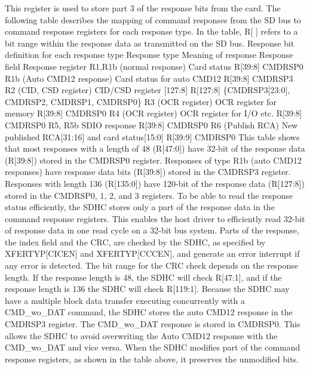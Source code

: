 This register is used to store part 3 of the response bits from the card. The following table describes the mapping of command responses from the SD bus to command response registers for each response type. In the table, R\mbox{[} \mbox{]} refers to a bit range within the response data as transmitted on the SD bus. Response bit definition for each response type Response type Meaning of response Response field Response register R1,R1b (normal response) Card status R\mbox{[}39\+:8\mbox{]} C\+M\+D\+R\+S\+P0 R1b (Auto C\+M\+D12 response) Card status for auto C\+M\+D12 R\mbox{[}39\+:8\mbox{]} C\+M\+D\+R\+S\+P3 R2 (C\+ID, C\+SD register) C\+I\+D/\+C\+SD register \mbox{[}127\+:8\mbox{]} R\mbox{[}127\+:8\mbox{]} \{C\+M\+D\+R\+S\+P3\mbox{[}23\+:0\mbox{]}, C\+M\+D\+R\+S\+P2, C\+M\+D\+R\+S\+P1, C\+M\+D\+R\+S\+P0\} R3 (O\+CR register) O\+CR register for memory R\mbox{[}39\+:8\mbox{]} C\+M\+D\+R\+S\+P0 R4 (O\+CR register) O\+CR register for I/O etc. R\mbox{[}39\+:8\mbox{]} C\+M\+D\+R\+S\+P0 R5, R5b S\+D\+IO response R\mbox{[}39\+:8\mbox{]} C\+M\+D\+R\+S\+P0 R6 (Publish R\+CA) New published R\+CA\mbox{[}31\+:16\mbox{]} and card status\mbox{[}15\+:0\mbox{]} R\mbox{[}39\+:9\mbox{]} C\+M\+D\+R\+S\+P0 This table shows that most responses with a length of 48 (R\mbox{[}47\+:0\mbox{]}) have 32-\/bit of the response data (R\mbox{[}39\+:8\mbox{]}) stored in the C\+M\+D\+R\+S\+P0 register. Responses of type R1b (auto C\+M\+D12 responses) have response data bits (R\mbox{[}39\+:8\mbox{]}) stored in the C\+M\+D\+R\+S\+P3 register. Responses with length 136 (R\mbox{[}135\+:0\mbox{]}) have 120-\/bit of the response data (R\mbox{[}127\+:8\mbox{]}) stored in the C\+M\+D\+R\+S\+P0, 1, 2, and 3 registers. To be able to read the response status efficiently, the S\+D\+HC stores only a part of the response data in the command response registers. This enables the host driver to efficiently read 32-\/bit of response data in one read cycle on a 32-\/bit bus system. Parts of the response, the index field and the C\+RC, are checked by the S\+D\+HC, as specified by X\+F\+E\+R\+T\+YP\mbox{[}C\+I\+C\+EN\mbox{]} and X\+F\+E\+R\+T\+YP\mbox{[}C\+C\+C\+EN\mbox{]}, and generate an error interrupt if any error is detected. The bit range for the C\+RC check depends on the response length. If the response length is 48, the S\+D\+HC will check R\mbox{[}47\+:1\mbox{]}, and if the response length is 136 the S\+D\+HC will check R\mbox{[}119\+:1\mbox{]}. Because the S\+D\+HC may have a multiple block data transfer executing concurrently with a C\+M\+D\+\_\+wo\+\_\+\+D\+AT command, the S\+D\+HC stores the auto C\+M\+D12 response in the C\+M\+D\+R\+S\+P3 register. The C\+M\+D\+\_\+wo\+\_\+\+D\+AT response is stored in C\+M\+D\+R\+S\+P0. This allows the S\+D\+HC to avoid overwriting the Auto C\+M\+D12 response with the C\+M\+D\+\_\+wo\+\_\+\+D\+AT and vice versa. When the S\+D\+HC modifies part of the command response registers, as shown in the table above, it preserves the unmodified bits. 

